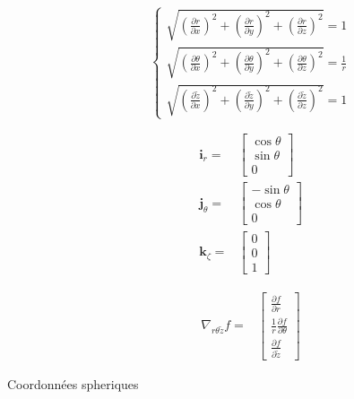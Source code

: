 \documentclass
[
a4paper,                      %
twoside,					  %
12pt,                         %
abstract,		      %
fleqn,                        %
]
{scrartcl} %
\begin{document}
\begin{description}
\begin{equation}
\begin{cases}
\sqrt{\left(\frac{\partial r}{\partial x}\right)^{2}+\left(\frac{\partial r}{\partial y}\right)^{2}+\left(\frac{\partial r}{\partial z}\right)^{2}}=1\\
\sqrt{\left(\frac{\partial\theta}{\partial x}\right)^{2}+\left(\frac{\partial\theta}{\partial y}\right)^{2}+\left(\frac{\partial\theta}{\partial z}\right)^{2}}=\frac{1}{r}\\
\sqrt{\left(\frac{\partial\tilde{z}}{\partial x}\right)^{2}+\left(\frac{\partial\tilde{z}}{\partial y}\right)^{2}+\left(\frac{\partial\tilde{z}}{\partial z}\right)^{2}}=1
\end{cases}
\end{equation}

\begin{equation}
\begin{aligned}
\mathbf{i}_{r}=&\begin{bmatrix}
\cos{\theta}\\[5pt]
\sin{\theta}\\[5pt]
0\end{bmatrix}\\
\mathbf{j}_{\theta}=&\begin{bmatrix}
-\sin{\theta}\\[5pt]
\cos{\theta}\\[5pt]
0\end{bmatrix}\\
\mathbf{k}_{\zeta}=&\begin{bmatrix}
0\\[5pt]
0\\[5pt]
1
\end{bmatrix}
\end{aligned}
\end{equation}

\begin{equation}
\begin{aligned}
\nabla_{r\theta\tilde{z}} f=&\begin{bmatrix}
\frac{\partial f}{\partial r}\\[10pt]
\frac{1}{r}\frac{\partial f}{\partial\theta}\\[10pt]
\frac{\partial f}{\partial\tilde{z}}
\end{bmatrix}
\end{aligned}
\end{equation}

\item[Coordonn\'ees spheriques]
\end{description}
\end{document}
